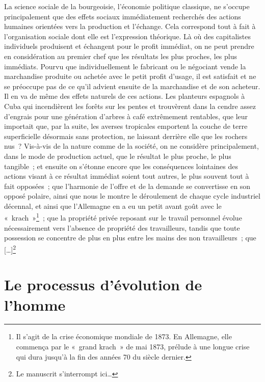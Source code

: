 \documentclass[french,twoside]{book} %
\begin{document}
La science sociale de la bourgeoisie, l’économie politique classique, ne s’occupe principalement que des effets sociaux immédiatement recherchés des actions humaines orientées vers la production et l’échange. Cela correspond tout à fait à l’organisation sociale dont elle est l’expression théorique. Là où des capitalistes individuels produisent et échangent pour le profit immédiat, on ne peut prendre en considération au premier chef que les résultats les plus proches, les plus immédiats. Pourvu que individuellement le fabricant ou le négociant vende la marchandise produite ou achetée avec le petit profit d’usage, il est satisfait et ne se préoccupe pas de ce qu’il advient ensuite de la marchandise et de son acheteur. Il en va de même des effets naturels de ces actions. Les planteurs espagnols à Cuba qui incendièrent les forêts sur les pentes et trouvèrent dans la cendre assez d’engrais pour une génération d’arbres à café extrêmement rentables, que leur importait que, par la suite, les averses tropicales emportent la couche de terre superficielle désormais sans protection, ne laissant derrière elle que les rochers nus ? Vis-à-vis de la nature comme de la société, on ne considère principalement, dans le mode de production actuel, que le résultat le plus proche, le plus tangible ; et ensuite on s’étonne encore que les conséquences lointaines des actions visant à ce résultat immédiat soient tout autres, le plus souvent tout à fait opposées ; que l’harmonie de l’offre et de la demande se convertisse en son opposé polaire, ainsi que nous le montre le déroulement de chaque cycle industriel décennal, et ainsi que l’Allemagne en a eu un petit avant goût avec le « krach »\footnote{Il s’agit de la crise économique mondiale de 1873. En Allemagne, elle commença par le « grand krach » de mai 1873, prélude à une longue crise qui dura jusqu’à la fin des années 70 du siècle dernier.} ; que la propriété privée reposant sur le travail personnel évolue nécessairement vers l’absence de propriété des travailleurs, tandis que toute possession se concentre de plus en plus entre les mains des non travailleurs ; que […]\footnote{Le manuscrit s’interrompt ici…}\par
\bigbreak
\section[Le processus d’évolution de l’homme]{Le processus d’évolution de l’homme\protect\footnotemark }\renewcommand{\leftmark}{Le processus d’évolution de l’homme}
\end{document}
